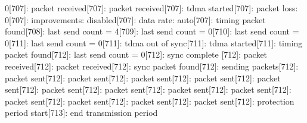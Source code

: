 \documentclass[parskip]{cs4rep}
\begin{document}
0[707]: packet received[707]: packet received[707]: tdma started[707]: packet loss: 0[707]: improvements: disabled[707]: data rate: auto[707]: timing packet found[708]: last send count = 4[709]: last send count = 0[710]: last send count = 0[711]: last send count = 0[711]: tdma out of sync[711]: tdma started[711]: timing packet found[712]: last send count = 0[712]: sync complete\newline
{}[712]: packet received[712]: packet received[712]: sync packet found[712]: sending packets[712]: packet sent[712]: packet sent[712]: packet sent[712]: packet sent[712]: packet sent[712]: packet sent[712]: packet sent[712]: packet sent[712]: packet sent[712]: packet sent[712]: packet sent[712]: packet sent[712]: packet sent[712]: protection period start[713]: end transmission period\newline
\end{document}
